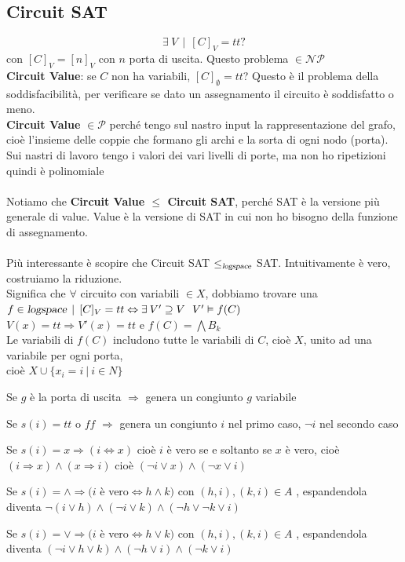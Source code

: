 \documentclass[10pt]{book}
\begin{document}
\subsection{Circuit SAT}
$$\exists\:V\:\:|\:\:[C]_V = tt ?$$ con $[C]_V = [n]_V$ con $n$ porta di uscita. Questo problema $\in \mathscr{NP}$\\
\textbf{Circuit Value}: se $C$ non ha variabili, $[C]_\emptyset = tt$? Questo è il problema della soddisfacibilità, per verificare se dato un assegnamento il circuito è soddisfatto o meno.\\
\textbf{Circuit Value} $\in \mathscr{P}$ perché tengo sul nastro input la rappresentazione del grafo, cioè l'insieme delle coppie che formano gli archi e la sorta di ogni nodo (porta).\\
Sui nastri di lavoro tengo i valori dei vari livelli di porte, ma non ho ripetizioni quindi è polinomiale\\\\ %
Notiamo che \textbf{Circuit Value $\leq$ Circuit SAT}, perché SAT è la versione più generale di value. Value è la versione di SAT in cui non ho bisogno della funzione di assegnamento.\\\\
Più interessante è scopire che Circuit SAT $\leq_{\textsl{logspace}}$ SAT. Intuitivamente è vero, costruiamo la riduzione.\\
Significa che $\forall$ circuito con variabili $\in X$, dobbiamo trovare una $f \in \textsl{logspace}\:\:|\:\:[C]_V = tt \Leftrightarrow\exists\:V'\supseteq V\:\:\:V'\vDash f(C)$\\
$V(x) = tt \Rightarrow V'(x) = tt$ e $f(C) = \bigwedge B_k$\\
Le variabili di $f(C)$ includono tutte le variabili di $C$, cioè $X$, unito ad una variabile per ogni porta,\\cioè $X \cup \{x_i = i\:|\:i \in N\}$
\begin{list}{}{}
	\item Se $g$ è la porta di uscita $\Rightarrow$ genera un congiunto $g$ variabile
	\item Se $s(i) = tt$ o $ff$ $\Rightarrow$ genera un congiunto $i$ nel primo caso, $\neg i$ nel secondo caso
	\item Se $s(i) = x \Rightarrow (i \Leftrightarrow x)$ cioè $i$ è vero se e soltanto se $x$ è vero, cioè $(i \Rightarrow x) \wedge (x \Rightarrow i)$ cioè $(\neg i \vee x) \wedge (\neg x \vee i)$
	\item Se $s(i) = \wedge \Rightarrow (i$ è vero$ \Leftrightarrow h \wedge k)$ con  $(h,i), (k,i)\in A$ , espandendola diventa $\neg(i \vee h) \wedge (\neg i \vee k) \wedge (\neg h \vee \neg k \vee i)$
	\item Se $s(i) = \vee \Rightarrow (i$ è vero$ \Leftrightarrow h \vee k)$ con  $(h,i), (k,i)\in A$ , espandendola diventa $(\neg i \vee h \vee k) \wedge (\neg h \vee i) \wedge (\neg k \vee i)$
\end{list}
\end{document}
